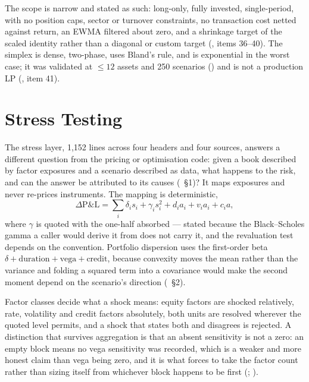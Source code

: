 \documentclass[11pt,a4paper]{article}
\begin{document}
The scope is narrow and stated as such: long-only, fully invested, single-period, with no
position caps, sector or turnover constraints, no transaction cost netted against return, an
EWMA filtered about zero, and a shrinkage target of the scaled identity rather than a diagonal
or custom target (, items 36--40). The simplex is dense, two-phase,
uses Bland's rule, and is exponential in the worst case; it was validated at $\le 12$ assets
and 250 scenarios () and is
not a production LP (, item 41).

\section{Stress Testing}
\label{sec:stress}

The stress layer, 1{,}152 lines across four headers and four sources, answers a different
question from the pricing or optimisation code: given a book described by factor exposures
and a scenario described as data, what happens to the risk, and can the answer be attributed
to its causes (~\S1)? It maps exposures
and never re-prices instruments. The mapping is deterministic,
\begin{equation}
\Delta \text{P\&L} = \sum_i \delta_i s_i + \gamma_i s_i^2 + d_i a_i + v_i a_i + c_i a,
\end{equation}
where $\gamma$ is quoted with the one-half absorbed --- stated because the Black--Scholes gamma
a caller would derive it from does not carry it, and the revaluation test depends on the
convention. Portfolio dispersion uses the first-order beta $\delta + \text{duration} +
\text{vega} + \text{credit}$, because convexity moves the mean rather than the variance and
folding a squared term into a covariance would make the second moment depend on the scenario's
direction (~\S2).

Factor classes decide what a shock means: equity factors are shocked relatively, rate,
volatility and credit factors absolutely, both units are resolved wherever the quoted level
permits, and a shock that states both and disagrees is rejected. A distinction that survives
aggregation is that an absent sensitivity is not a zero: an empty  block means no
vega sensitivity was recorded, which is a weaker and more honest claim than vega being zero,
and it is what forces  to take the factor count rather than sizing itself from
whichever block happens to be first (;
).
\end{document}
